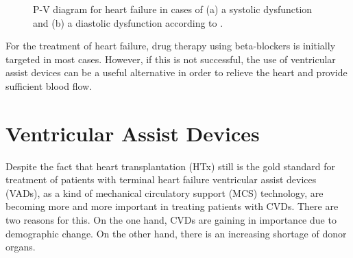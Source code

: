\begin{figure}
  \centering
  \caption[P-V diagram for heart failure]{P-V diagram for heart failure in cases of (a) a systolic dysfunction and (b) a diastolic dysfunction according to \cite{HKS_pv}.}
  \label{fig:hf_dys}
\end{figure}

For the treatment of heart failure, drug therapy using beta-blockers is initially targeted in most cases. However, if this is not successful, the use of ventricular assist devices can be a useful alternative in order to relieve the heart and provide sufficient blood flow. \cite{HKS4}

\section{Ventricular Assist Devices}
Despite the fact that heart transplantation (HTx) still is the gold standard for treatment of patients with terminal heart failure \cite{VAD2} ventricular assist devices (VADs), as a kind of mechanical circulatory support (MCS) technology, are becoming more and more important in treating patients with CVDs. There are two reasons for this. On the one hand, CVDs are gaining in importance due to demographic change. On the other hand, there is an increasing shortage of donor organs. \cite{VAD7}

